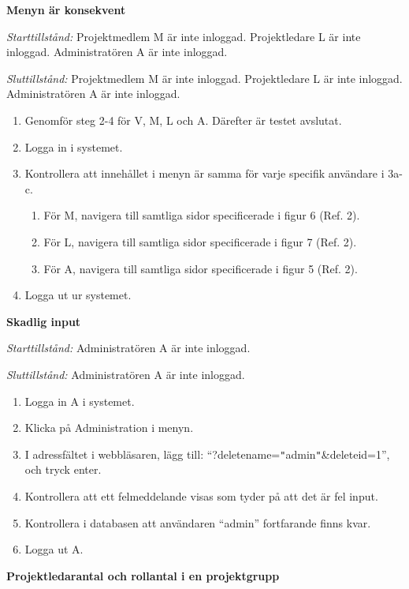 \documentclass[a4paper]{article}
\begin{document}
\begin{FT}
\item \textbf{Menyn är konsekvent}

\emph{Starttillstånd:} Projektmedlem M är inte inloggad. Projektledare L är inte inloggad. Administratören A är inte inloggad.

\emph{Sluttillstånd:} Projektmedlem M är inte inloggad. Projektledare L är inte inloggad. Administratören A är inte inloggad.

\begin{enumerate}
\item Genomför steg 2-4 för V, M, L och A. Därefter är testet avslutat.
\item Logga in i systemet.
\item Kontrollera att innehållet i menyn är samma för varje specifik användare i 3a-c.
\begin{enumerate}
\item För M, navigera till samtliga sidor specificerade i figur 6 (Ref. 2).
\item För L, navigera till samtliga sidor specificerade i figur 7 (Ref. 2).
\item För A, navigera till samtliga sidor specificerade i figur 5 (Ref. 2).
\end{enumerate}
\item Logga ut ur systemet.
\end{enumerate}

\item \textbf{Skadlig input}

\emph{Starttillstånd:} Administratören A är inte inloggad.

\emph{Sluttillstånd:} Administratören A är inte inloggad.

\begin{enumerate}
\item Logga in A i systemet.
\item Klicka på Administration i menyn.
\item I adressfältet i webbläsaren, lägg till: ``?deletename=\texttt{"}admin\texttt{"}\&deleteid=1'', och tryck enter.
\item Kontrollera att ett felmeddelande visas som tyder på att det är fel input.
\item Kontrollera i databasen att användaren ``admin'' fortfarande finns kvar.
\item Logga ut A.
\end{enumerate}

\item \textbf{Projektledarantal och rollantal i en projektgrupp}


\end{FT}
\end{document}
